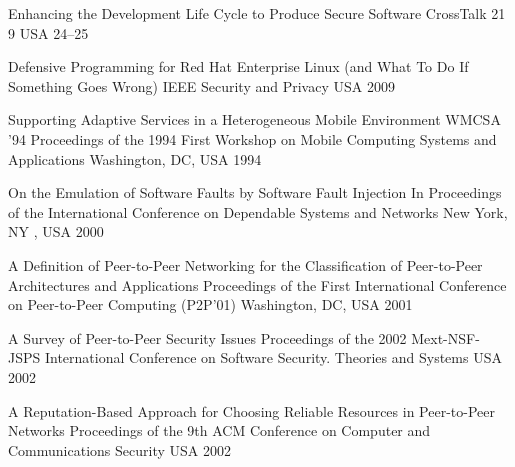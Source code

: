 \begin{thebibliography}{9}
		{}
		{Enhancing the Development Life Cycle to Produce Secure Software}
		{CrossTalk}
		{21}
		{9}
		{USA}
		{}
		{24--25}
	
		{}
		{Defensive Programming for {R}ed {H}at {E}nterprise {L}inux (and What To Do If Something Goes Wrong)}
		{{IEEE} Security and Privacy}
		{}
		{}
		{USA}
		{2009}
		{}
		

		{
			\biband
			\biband
			\biband
			}
		{Supporting Adaptive Services in a Heterogeneous Mobile Environment}
		{WMCSA '94 Proceedings of the 1994 First Workshop on Mobile Computing Systems and Applications}
		{Washington, DC, USA}
		{1994}
		
		{
			\biband
			\biband
			}
		{On the Emulation of Software Faults by Software Fault Injection}
		{In Proceedings of the International Conference on Dependable Systems and Networks}
		{New York, NY , USA}
		{2000}
	
		{}
		{A Definition of Peer-to-Peer Networking for the Classification of Peer-to-Peer Architectures and Applications}
		{Proceedings of the First International Conference on Peer-to-Peer Computing ({P2P}'01)}
		{Washington, DC, USA}
		{2001}

		{}
		{A Survey of Peer-to-Peer Security Issues}
		{Proceedings of the 2002 {M}ext-{NSF}-{JSPS} International Conference on Software Security. Theories and Systems}
		{USA}
		{2002}
	
		{
			\biband
			\biband
			\biband
			\biband
			}
		{A Reputation-Based Approach for Choosing Reliable Resources in Peer-to-Peer Networks}
		{Proceedings of the 9th ACM Conference on Computer and Communications Security}
		{USA}
		{2002}
		

\end{thebibliography}
